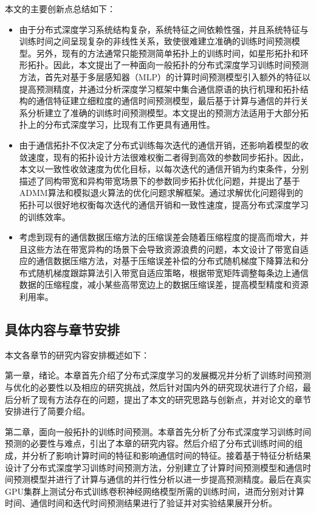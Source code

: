 本文的主要创新点总结如下：
\begin{itemize}
  \item 由于分布式深度学习系统结构复杂，系统特征之间依赖性强，并且系统特征与训练时间之间呈现复杂的非线性关系，致使很难建立准确的训练时间预测模型。另外，现有的方法通常只能预测简单拓扑上的训练时间，如星形拓扑和环形拓扑。因此，本文提出了一种面向一般拓扑的分布式深度学习训练时间预测方法，首先对基于多层感知器（MLP）的计算时间预测模型引入额外的特征以提高预测精度，并通过分析深度学习框架中集合通信原语的执行机理和拓扑结构的通信特征建立细粒度的通信时间预测模型，最后基于计算与通信的并行关系分析建立了准确的训练时间预测模型。本文提出的预测方法适用于大部分拓扑上的分布式深度学习，比现有工作更具有通用性。
  \item 由于通信拓扑不仅决定了分布式训练每次迭代的通信开销，还影响着模型的收敛速度，现有的拓扑设计方法很难权衡二者得到高效的参数同步拓扑。因此，本文以一致性收敛速度为优化目标，以每次迭代的通信开销为约束条件，分别描述了同构带宽和异构带宽场景下的参数同步拓扑优化问题，并提出了基于ADMM算法和模拟退火算法的优化问题求解框架。通过求解优化问题得到的拓扑可以很好地权衡每次迭代的通信开销和一致性速度，提高分布式深度学习的训练效率。
  \item 考虑到现有的通信数据压缩方法的压缩误差会随着压缩程度的提高而增大，并且这些方法在带宽异构的场景下会导致资源浪费的问题，本文设计了带宽自适应的通信数据压缩方法，对基于压缩误差补偿的分布式随机梯度下降算法和分布式随机梯度跟踪算法引入带宽自适应策略，根据带宽矩阵调整每条边上通信数据的压缩程度，减小某些高带宽边上的数据压缩误差，提高模型精度和资源利用率。
\end{itemize}

\subsection{具体内容与章节安排}

本文各章节的研究内容安排概述如下：

第一章，绪论。本章首先介绍了分布式深度学习的发展概况并分析了训练时间预测与优化的必要性以及相应的研究挑战，然后针对国内外的研究现状进行了介绍，最后分析了现有方法存在的问题，提出了本文的研究思路与创新点，并对论文的章节安排进行了简要介绍。

第二章，面向一般拓扑的训练时间预测。本章首先分析了分布式深度学习训练时间预测的必要性与难点，引出了本章的研究内容。然后介绍了分布式训练时间的组成，并分析了影响计算时间的特征和影响通信时间的特征。接着基于特征分析结果设计了分布式深度学习训练时间预测方法，分别建立了计算时间预测模型和通信时间预测模型并进行了计算与通信的并行性分析以进一步提高预测精度。最后在真实GPU集群上测试分布式训练卷积神经网络模型所需的训练时间，进而分别对计算时间、通信时间和迭代时间预测结果进行了验证并对实验结果展开分析。

